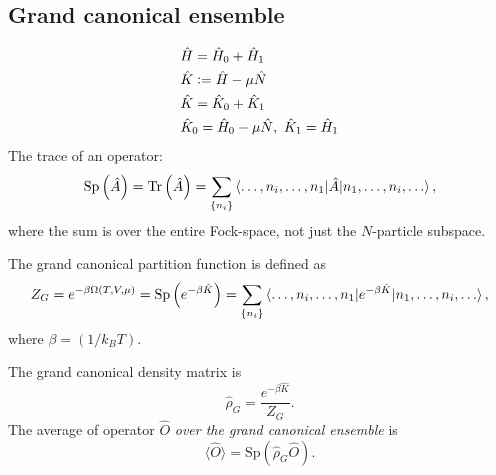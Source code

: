 \documentclass[11pt, a4paper]{article}
\newcommand{\Tr}[1]{\mathrm{Tr}\left(#1\right)}
\newcommand{\Sp}[1]{\mathrm{Sp}\left({#1}\right)}
\begin{document}
\subsection{Grand canonical ensemble}
\begin{align*}
    &\hat H = \hat H_0 + \hat H_1\\
    &\hat K \vcentcolon= \hat H - \mu \hat N\\
    &\hat K = \hat K_0 + \hat K_1\\
    &\hat K_0 = \hat H_0 - \mu \hat N, ~ \hat K_1 = \hat H_1
\end{align*}
The trace of an operator:
\begin{equation*}
    \Sp{\hat A} = \Tr{\hat A} = \sum\limits_{\{n_i\}}\braket{\dots, n_i, \dots, n_1 | \hat A |n_1, \dots, n_i, \dots},
\end{equation*}
where the sum is over the entire Fock-space, not just the $N$-particle subspace.
\par The grand canonical partition function is defined as 
\begin{equation*}
    Z_G = e^{-\beta\Omega(T,V,\mu)} = \Sp{e^{-\beta\hat K}} = 
    \sum\limits_{\{n_i\}}\braket{\dots, n_i, \dots, n_1 | e^{-\beta\hat K} |n_1, \dots, n_i, \dots},
\end{equation*}
where $\beta = (1/k_BT)$.
\par The grand canonical density matrix is 
\begin{equation*}
    \hat\rho_G = \frac{e^{-\beta\hat K}}{Z_G}.
\end{equation*}
The average of operator $\hat O$ \textit{over the grand canonical ensemble} is
\begin{equation*}
    \langle \hat O \rangle = \Sp{\hat \rho_G \hat O}.
\end{equation*}
\end{document}
